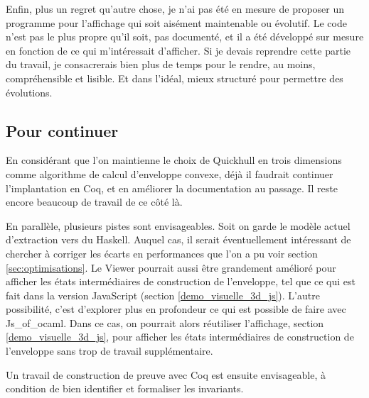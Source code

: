 \documentclass[]{article}
\begin{document}
Enfin, plus un regret qu'autre chose, je n'ai pas été en mesure de proposer un programme pour l'affichage qui soit aisément maintenable ou évolutif. Le code n'est pas le plus propre qu'il soit, pas documenté, et il a été développé sur mesure en fonction de ce qui m'intéressait d'afficher. Si je devais reprendre cette partie du travail, je consacrerais bien plus de temps pour le rendre, au moins, compréhensible et lisible. Et dans l'idéal, mieux structuré pour permettre des évolutions.

\subsection{Pour continuer}
En considérant que l'on maintienne le choix de Quickhull en trois dimensions comme algorithme de calcul d'enveloppe convexe, déjà il faudrait continuer l'implantation en Coq, et en améliorer la documentation au passage. Il reste encore beaucoup de travail de ce côté là.

En parallèle, plusieurs pistes sont envisageables. Soit on garde le modèle actuel d'extraction vers du Haskell. Auquel cas, il serait éventuellement intéressant de chercher à corriger les écarts en performances que l'on a pu voir section \ref{sec:optimisations}. Le Viewer pourrait aussi être grandement amélioré pour afficher les états intermédiaires de construction de l'enveloppe, tel que ce qui est fait dans la version JavaScript (section \ref{demo_visuelle_3d_js}). L'autre possibilité, c'est d'explorer plus en profondeur ce qui est possible de faire avec Js\_of\_ocaml. Dans ce cas, on pourrait alors réutiliser l'affichage, section \ref{demo_visuelle_3d_js}, pour afficher les états intermédiaires de construction de l'enveloppe sans trop de travail supplémentaire.

Un travail de construction de preuve avec Coq est ensuite envisageable, à condition de bien identifier et formaliser les invariants.

\pagebreak


\end{document}

